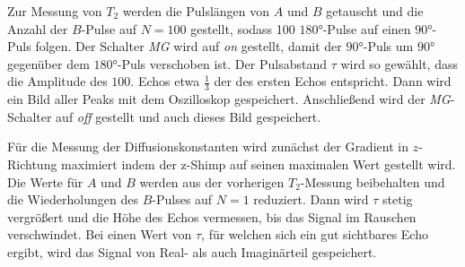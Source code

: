 Zur Messung von $T_2$ werden die Pulslängen von $A$ und $B$ getauscht und die Anzahl der $B$-Pulse auf $N=100$ gestellt, sodass 100 $180°$-Pulse auf einen $90°$-Puls folgen.
Der Schalter \textit{MG} wird auf \textit{on} gestellt, damit der $90°$-Puls um $90°$ gegenüber dem $180°$-Puls verschoben ist.
Der Pulsabstand $\tau$ wird so gewählt, dass die Amplitude des $100.$ Echos etwa $\textstyle{\frac{1}{3}}$ der des ersten Echos entspricht.
Dann wird ein Bild aller Peaks mit dem Oszilloskop gespeichert.
Anschließend wird der \textit{MG}-Schalter auf \textit{off} gestellt und auch dieses Bild gespeichert.

Für die Messung der Diffusionskonstanten wird zunächst der Gradient in $z$-Richtung maximiert indem der z-Shimp auf seinen maximalen Wert gestellt wird.
Die Werte für $A$ und $B$ werden aus der vorherigen $T_2$-Messung beibehalten und die Wiederholungen des $B$-Pulses auf $N=1$ reduziert.
Dann wird $\tau$ stetig vergrößert und die Höhe des Echos vermessen, bis das Signal im Rauschen verschwindet.
Bei einen Wert von $\tau$, für welchen sich ein gut sichtbares Echo ergibt, wird das Signal von Real- als auch Imaginärteil gespeichert.